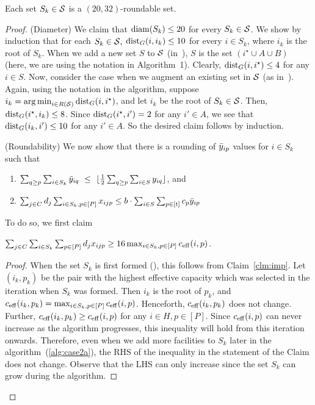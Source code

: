 \begin{lemma}
\label{lem:sk}
Each set $S_k \in {\cal S}$ is a $(20,32)$-roundable set.
\end{lemma}
\begin{proof}
(Diameter) We claim that $\mathrm{diam}(S_k) \leq 20$ for every $S_k \in {\cal S}$. We show by induction that for each $S_k \in {\cal S},$
$\mathrm{dist}_G(i,i_k) \leq 10$ for every $i \in S_k$, where $i_k$ is the root of $S_k$. When we add a new set $S$ to ${\cal S}$ (in~),
$S$ is the set $(i^\star \cup A \cup B)$ (here, we are using the notation in Algorithm~1). Clearly, $\mathrm{dist}_G(i, i^\star) \leq 4$
for any $i \in S$. Now, consider the case when we augment an existing set  in $\cal S$ (as in~).
Again, using the notation in the algorithm, suppose $i_k = \operatorname*{arg\,min}_{i \in R({\cal S})} \mathrm{dist}_G(i, i^\star)$, and let $i_k$ be the
root of $S_k \in {\cal S}$. Then, $\mathrm{dist}_G(i^\star, i_k) \leq 8$. Since $\mathrm{dist}_G(i^\star, i') = 2$ for any $i' \in A$, we see that
$\mathrm{dist}_G(i_k, i') \leq 10$ for any $i' \in A$.
So the desired claim follows by induction.
\smallskip

\noindent
(Roundability)
We now show that there is a rounding of $\bar{y}_{ip}$ values for $i\in S_k$ such that
		\begin{enumerate}
			\item $\sum_{q \geq p} \sum_{i\in S_k} \bar{y}_{iq} ~\leq~ \lfloor\frac12 \sum_{q \geq p}\sum_{i\in S} y_{iq}\rfloor$, and
			\item $\sum_{j\in C} d_j \sum_{i\in S_k,p\in [P]} x_{ijp} \leq b\cdot \sum_{i\in S} \sum_{p\in [t]} c_p\bar{y}_{ip}$
		\end{enumerate}
To do so, we first claim
\begin{claim}\label{clm:imp2}
	 $\sum_{j\in C}\sum_{i\in S_k}\sum_{p\in [P]} d_jx_{ijp} \geq 16\max_{i\in S_k,p\in [P]} c_{\mathrm{eff}}(i,p)$.
\end{claim}
\begin{proof}
	When the set $S_k$ is first formed (), this follows from Claim~\ref{clm:imp}. Let $(i_k, p_k)$ be the pair
	with the highest effective capacity which was selected in the iteration when $S_k$ was formed. Then $i_k$ is the
	root of $p_k$, and $c_{\mathrm{eff}}(i_k, p_k) = \max_{i\in S_k,p\in [P]} c_{\mathrm{eff}}(i,p)$. Henceforth, $c_{\mathrm{eff}}(i_k, p_k)$ does not
	change. Further, $c_{\mathrm{eff}}(i_k, p_k) \geq c_{\mathrm{eff}}(i,p)$ for any $i \in H, p \in [P]$. Since $c_{\mathrm{eff}}(i,p)$ can never increase as the
	algorithm progresses, this inequality will hold from this iteration onwards. Therefore, even when we add more facilities
	to $S_k$ later in the algorithm~(\cref{alg:case2a}), the RHS of the inequality in the statement of the Claim does not change.
	Observe that the LHS can only increase since the set $S_k$ can grow during the algorithm.
\end{proof}


\end{proof}
